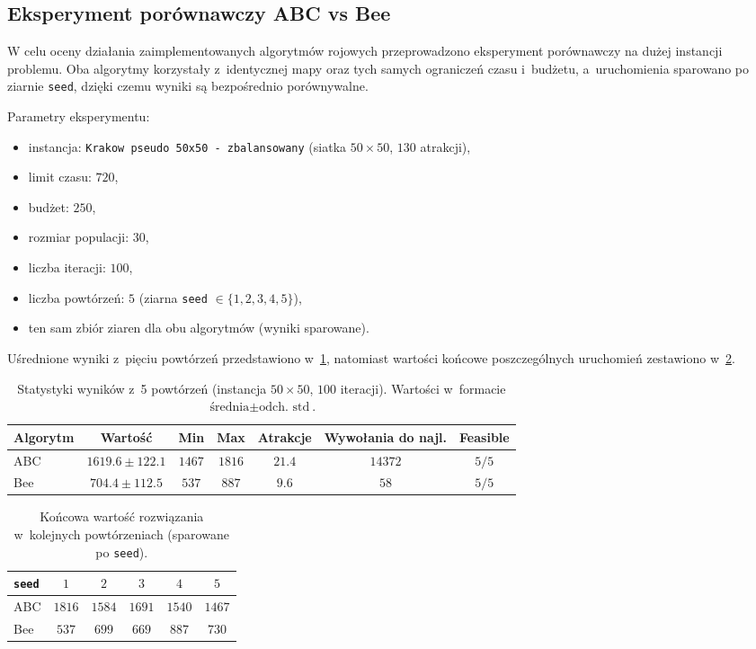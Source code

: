 \subsection{Eksperyment porównawczy ABC vs Bee}
\label{sec:eksperyment-abc-bee}

W celu oceny działania zaimplementowanych algorytmów rojowych przeprowadzono
eksperyment porównawczy na dużej instancji problemu. Oba algorytmy korzystały
z~identycznej mapy oraz tych samych ograniczeń czasu i~budżetu, a~uruchomienia
sparowano po ziarnie \texttt{seed}, dzięki czemu wyniki są bezpośrednio
porównywalne.

Parametry eksperymentu:
\begin{itemize}
    \item instancja: \texttt{Krakow pseudo 50x50 - zbalansowany}
          (siatka $50 \times 50$, $130$ atrakcji),
    \item limit czasu: $720$,
    \item budżet: $250$,
    \item rozmiar populacji: $30$,
    \item liczba iteracji: $100$,
    \item liczba powtórzeń: $5$ (ziarna \texttt{seed} $\in \{1,2,3,4,5\}$),
    \item ten sam zbiór ziaren dla obu algorytmów (wyniki sparowane).
\end{itemize}

Uśrednione wyniki z~pięciu powtórzeń przedstawiono w~\cref{tab:abc-bee-stats},
natomiast wartości końcowe poszczególnych uruchomień zestawiono
w~\cref{tab:abc-bee-paired}.

\begin{table}[H]
\centering
\caption{Statystyki wyników z~5 powtórzeń (instancja $50\times50$, $100$ iteracji).
Wartości w~formacie $\text{średnia} \pm \text{odch.\ std}$.}
\label{tab:abc-bee-stats}
\begin{tabular}{lcccccc}
\toprule
Algorytm &
Wartość &
Min &
Max &
Atrakcje &
Wywołania do najl. &
Feasible \\
\midrule
ABC &
$1619.6 \pm 122.1$ &
$1467$ &
$1816$ &
$21.4$ &
$14372$ &
$5/5$ \\
Bee &
$704.4 \pm 112.5$ &
$537$ &
$887$ &
$9.6$ &
$58$ &
$5/5$ \\
\bottomrule
\end{tabular}
\end{table}

\begin{table}[H]
\centering
\caption{Końcowa wartość rozwiązania w~kolejnych powtórzeniach (sparowane po \texttt{seed}).}
\label{tab:abc-bee-paired}
\begin{tabular}{lccccc}
\toprule
\texttt{seed} & $1$ & $2$ & $3$ & $4$ & $5$ \\
\midrule
ABC & $1816$ & $1584$ & $1691$ & $1540$ & $1467$ \\
Bee & $537$  & $699$  & $669$  & $887$  & $730$  \\
\bottomrule
\end{tabular}
\end{table}

